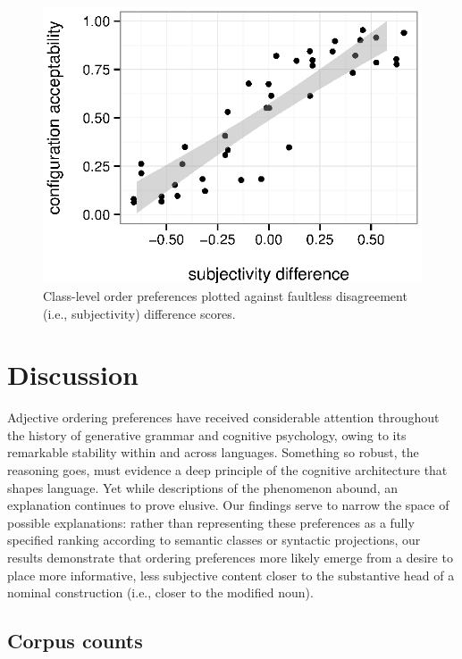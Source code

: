 \documentclass{pnastwo}
\begin{document}
\begin{article}
\begin{figure}[h]
	\centering
	\includegraphics[width=\linewidth]{plots/comparison2.eps}
	\caption{Class-level order preferences plotted against faultless disagreement (i.e., subjectivity) difference scores.}\label{faultless-order}
\end{figure}



\section{Discussion}

Adjective ordering preferences have received considerable attention throughout the history of generative grammar and cognitive psychology, owing to its remarkable stability within and across languages. Something so robust, the reasoning goes, must evidence a deep principle of the cognitive architecture that shapes language. Yet while descriptions of the phenomenon abound, an explanation continues to prove elusive. Our findings serve to narrow the space of possible explanations: rather than representing these preferences as a fully specified ranking according to semantic classes or syntactic projections, our results demonstrate that ordering preferences more likely emerge from a desire to place more informative, less subjective content closer to the substantive head of a nominal construction (i.e., closer to the modified noun).



\begin{materials}
\section{Corpus counts} 


\end{materials}
\end{article}
\end{document}
